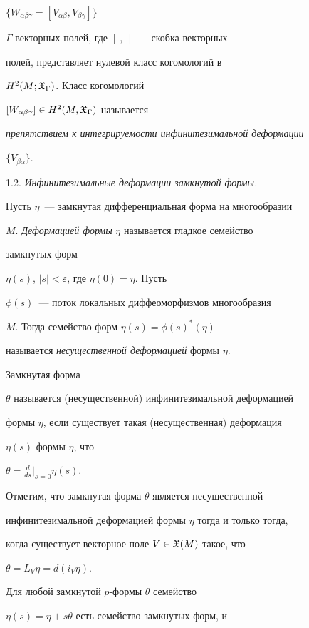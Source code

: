 $\{W_{\alpha\beta\gamma} = [V_{\alpha\beta}, V_{\beta\gamma}]\}$


$\Gamma$-векторных полей, где $[\ ,\ ]$~--- скобка векторных


полей, представляет нулевой класс когомологий в


$H^2(M;{\frak X}_\Gamma)$. Класс когомологий


$[W_{\alpha\beta\gamma}] \in H^2(M, {\frak X}_\Gamma)$ называется


{\em препятствием к интегрируемости инфинитезимальной деформации}


$\{V_{\beta\alpha}\}$.


\medskip





1.2. {\it Инфинитезимальные деформации замкнутой формы.}\label{ss2}


Пусть $\eta$~--- замкнутая дифференциальная форма на многообразии


$M$. {\em Деформацией формы} $\eta$ называется гладкое семейство


замкнутых форм


$\eta(s)$, $|s|<\varepsilon$, где $\eta(0)=\eta$. Пусть


$\phi(s)$~--- поток локальных диффеоморфизмов многообразия


$M$. Тогда семейство форм $\eta(s)= \phi(s)^*(\eta)$


называется {\em несущественной деформацией} формы $\eta$.


Замкнутая форма


$\theta$ называется (несущественной) инфинитезимальной деформацией


формы $\eta$, если существует такая (несущественная) деформация


$\eta(s)$ формы $\eta$, что


$\theta = \frac{d}{ds}\big|_{s=0} \eta(s)$.


Отметим, что замкнутая форма $\theta$ является несущественной


инфинитезимальной деформацией  формы $\eta$ тогда и только тогда,


когда существует векторное поле $V \in {\frak X}(M)$ такое, что


$\theta=L_V \eta = d (i_V \eta)$.





Для любой замкнутой $p$-формы $\theta$ семейство


$\eta(s) = \eta + s \theta$ есть семейство замкнутых форм, и


